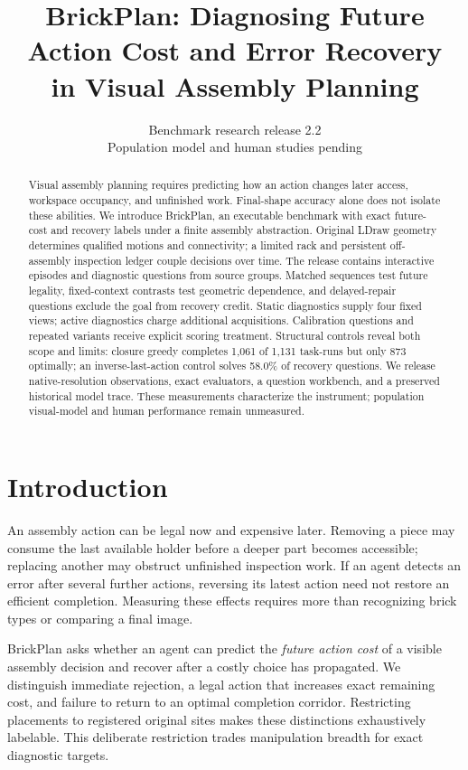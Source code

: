 \documentclass[10pt,twocolumn,letterpaper]{article}
\title{BrickPlan: Diagnosing Future Action Cost and Error Recovery\\in Visual Assembly Planning}
\author{Benchmark research release 2.2\\Population model and human studies pending}
\begin{document}
\raggedbottom
\maketitle

\begin{abstract}
Visual assembly planning requires predicting how an action changes later
access, workspace occupancy, and unfinished work. Final-shape accuracy
alone does not isolate these abilities. We introduce BrickPlan, an
executable benchmark with exact future-cost and recovery labels under
a finite assembly abstraction. Original LDraw geometry determines
qualified motions and connectivity; a limited rack and persistent
off-assembly inspection ledger couple decisions over time.
The release contains \EpisodeCount{} interactive episodes and
\ProbeCount{} diagnostic questions from \SourceCount{} source groups.
Matched sequences test future legality, fixed-context contrasts test
geometric dependence, and delayed-repair questions exclude the goal from
recovery credit. Static diagnostics supply four fixed views; active
diagnostics charge additional acquisitions. Calibration questions and
repeated variants receive explicit scoring treatment.
Structural controls reveal both scope and limits: closure greedy completes
1,061 of 1,131 task-runs but only 873 optimally; an inverse-last-action
control solves 58.0\% of recovery questions. We release native-resolution
observations, exact evaluators, a question workbench, and a preserved
historical model trace. These measurements characterize the instrument;
population visual-model and human performance remain unmeasured.
\end{abstract}

\section{Introduction}
An assembly action can be legal now and expensive later. Removing a
piece may consume the last available holder before a deeper part becomes
accessible; replacing another may obstruct unfinished inspection work.
If an agent detects an error after several further actions, reversing
its latest action need not restore an efficient completion.
Measuring these effects requires more than recognizing brick types
or comparing a final image.

BrickPlan asks whether an agent can predict the \emph{future action cost}
of a visible assembly decision and recover after a costly choice has
propagated. We distinguish immediate rejection, a legal action that
increases exact remaining cost, and failure to return to an optimal
completion corridor. Restricting placements to registered original
sites makes these distinctions exhaustively labelable. This deliberate
restriction trades manipulation breadth for exact diagnostic targets.
\end{document}
